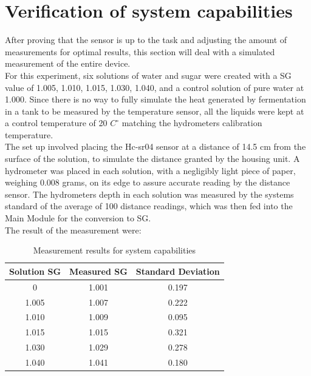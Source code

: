 \documentclass[twoside]{ctuthesis}
\theoremstyle{plain}
\theoremstyle{definition}
\theoremstyle{note}
\begin{document}
\section{Verification of system capabilities}
After proving that the sensor is up to the task and adjusting the amount of measurements for optimal results, this section will deal with a simulated measurement of the entire device.\\
For this experiment, six solutions of water and sugar were created with a SG value of 1.005, 1.010, 1.015, 1.030, 1.040, and a control solution of pure water at 1.000. Since there is no way to fully simulate the heat generated by fermentation in a tank to be measured by the temperature sensor, all the liquids were kept at a control temperature of 20 $C^\circ$ matching the hydrometers calibration temperature.\\
The set up involved placing the Hc-sr04 sensor at a distance of 14.5 cm from the surface of the solution, to simulate the distance granted by the housing unit.
A hydrometer was placed in each solution, with a negligibly light piece of paper, weighing 0.008 grams, on its edge to assure accurate reading by the distance sensor. The hydrometers depth in each solution was measured by the systems standard of the average of 100 distance readings, which was then fed into the Main Module for the conversion to SG.\\
The result of the measurement were:

\begin{table}[H]
	\centering
	\begin{tabular}{| c |c| c |}
		\hline
		Solution SG & Measured SG & Standard Deviation\\ \hline
		0 & 1.001 & 0.197\\
		1.005 & 1.007 & 0.222\\
		1.010 & 1.009 & 0.095\\
		1.015 & 1.015 & 0.321\\
		1.030 & 1.029 & 0.278\\
		1.040 & 1.041 & 0.180\\

		\hline
	\end{tabular}
	\caption{Measurement results for system capabilities}
\end{table}
\end{document}
